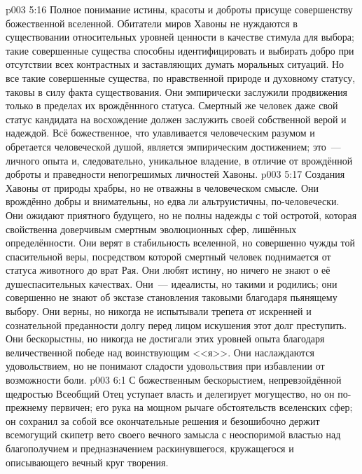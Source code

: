 \vs p003 5:16 \pc Полное понимание истины, красоты и доброты присуще совершенству божественной вселенной. Обитатели миров Хавоны не нуждаются в существовании относительных уровней ценности в качестве стимула для выбора; такие совершенные существа способны идентифицировать и выбирать добро при отсутствии всех контрастных и заставляющих думать моральных ситуаций. Но все такие совершенные существа, по нравственной природе и духовному статусу, таковы в силу факта существования. Они эмпирически заслужили продвижения только в пределах их врождённного статуса. Смертный же человек даже свой статус кандидата на восхождение должен заслужить своей собственной верой и надеждой. Всё божественное, что улавливается человеческим разумом и обретается человеческой душой, является эмпирическим достижением; это~---  личного опыта и, следовательно, уникальное владение, в отличие от врождённой доброты и праведности непогрешимых личностей Хавоны.
\vs p003 5:17 \pc Создания Хавоны от природы храбры, но не отважны в человеческом смысле. Они врождённо добры и внимательны, но едва ли альтруистичны, по\hyp{}человечески. Они ожидают приятного будущего, но не полны надежды с той остротой, которая свойственна доверчивым смертным эволюционных сфер, лишённых определённости. Они верят в стабильность вселенной, но совершенно чужды той спасительной веры, посредством которой смертный человек поднимается от статуса животного до врат Рая. Они любят истину, но ничего не знают о её душеспасительных качествах. Они~--- идеалисты, но такими и родились; они совершенно не знают об экстазе становления таковыми благодаря пьянящему выбору. Они верны, но никогда не испытывали трепета от искренней и сознательной преданности долгу перед лицом искушения этот долг преступить. Они бескорыстны, но никогда не достигали этих уровней опыта благодаря величественной победе над воинствующим <<я>>. Они наслаждаются удовольствием, но не понимают сладости удовольствия при избавлении от возможности боли.
\vs p003 6:1 С божественным бескорыстием, непревзойдённой щедростью Всеобщий Отец уступает власть и делегирует могущество, но он по\hyp{}прежнему первичен; его рука на мощном рычаге обстоятельств вселенских сфер; он сохранил за собой все окончательные решения и безошибочно держит всемогущий скипетр вето своего вечного замысла с неоспоримой властью над благополучием и предназначением раскинувшегося, кружащегося и описывающего вечный круг творения.
